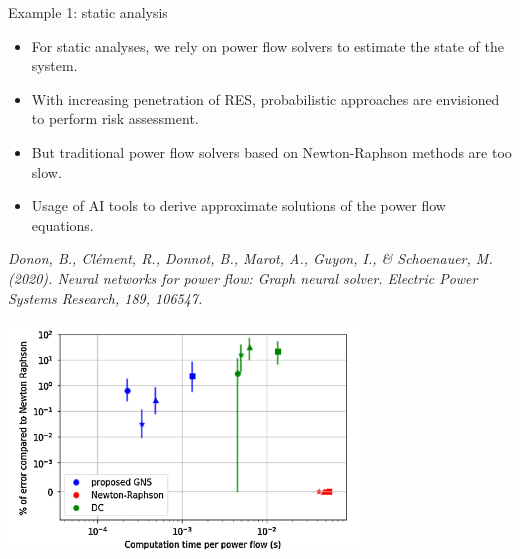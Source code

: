 \begin{frame}[allowframebreaks]{Example 1: static analysis}
\begin{itemize}
    \item For static analyses, we rely on power flow solvers to estimate the state of the system.
    \item With increasing penetration of RES, probabilistic approaches are envisioned to perform risk assessment.
    \item But traditional power flow solvers based on Newton-Raphson methods are too slow.
    \item Usage of AI tools to derive approximate solutions of the power flow equations.
\end{itemize}
\emph{Donon, B., Clément, R., Donnot, B., Marot, A., Guyon, I., \& Schoenauer, M. (2020). Neural networks for power flow: Graph neural solver. Electric Power Systems Research, 189, 106547.}
\begin{center}
\includegraphics[width=0.7\textwidth]{images/GNS.png}
\end{center}
\end{frame}

